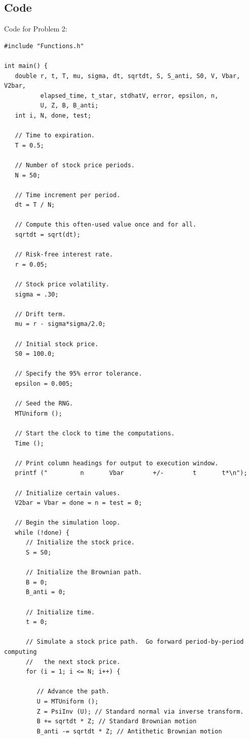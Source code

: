 \documentclass{report}
\begin{document}
\subsection*{Code}
Code for Problem 2:
\begin{lstlisting}
#include "Functions.h"

int main() {
   double r, t, T, mu, sigma, dt, sqrtdt, S, S_anti, S0, V, Vbar, V2bar,
          elapsed_time, t_star, stdhatV, error, epsilon, n,
          U, Z, B, B_anti;
   int i, N, done, test;

   // Time to expiration.
   T = 0.5;

   // Number of stock price periods.
   N = 50;

   // Time increment per period.
   dt = T / N;

   // Compute this often-used value once and for all.
   sqrtdt = sqrt(dt);

   // Risk-free interest rate.
   r = 0.05;

   // Stock price volatility.
   sigma = .30;

   // Drift term.
   mu = r - sigma*sigma/2.0;

   // Initial stock price.
   S0 = 100.0;

   // Specify the 95% error tolerance.
   epsilon = 0.005;

   // Seed the RNG.
   MTUniform ();

   // Start the clock to time the computations.
   Time ();

   // Print column headings for output to execution window.
   printf ("         n       Vbar        +/-        t       t*\n");

   // Initialize certain values.
   V2bar = Vbar = done = n = test = 0;

   // Begin the simulation loop.
   while (!done) {
      // Initialize the stock price.
      S = S0;

      // Initialize the Brownian path.
      B = 0;
      B_anti = 0;

      // Initialize time.
      t = 0;

      // Simulate a stock price path.  Go forward period-by-period computing
      //   the next stock price.
      for (i = 1; i <= N; i++) {

         // Advance the path.
         U = MTUniform ();
         Z = PsiInv (U); // Standard normal via inverse transform.
         B += sqrtdt * Z; // Standard Brownian motion
         B_anti -= sqrtdt * Z; // Antithetic Brownian motion


\end{lstlisting}
\end{document}
